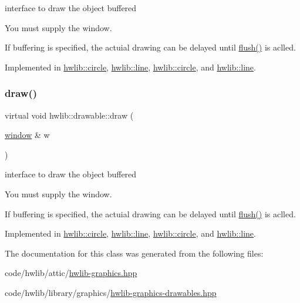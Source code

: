 interface to draw the object buffered 

You must supply the window.

If buffering is specified, the actuial drawing can be delayed until \hyperlink{namespacehwlib_a648fe94ca9899747a632c23f97007732}{flush()} is aclled. 

Implemented in \hyperlink{classhwlib_1_1circle_a7a4d6bbd0692b757eee4615a8c5ea9f4}{hwlib\+::circle}, \hyperlink{classhwlib_1_1line_a0a30c7c7e88377aada5ee1ec422bfc84}{hwlib\+::line}, \hyperlink{classhwlib_1_1circle_a7a4d6bbd0692b757eee4615a8c5ea9f4}{hwlib\+::circle}, and \hyperlink{classhwlib_1_1line_a0a30c7c7e88377aada5ee1ec422bfc84}{hwlib\+::line}.

\mbox{\label{classhwlib_1_1drawable_ac9ea0de52a14d9024cb34110f794ac28}} 
\subsubsection{\texorpdfstring{draw()}{draw()}\hspace{0.1cm}{\footnotesize\ttfamily [2/2]}}
{\footnotesize\ttfamily virtual void hwlib\+::drawable\+::draw (\begin{DoxyParamCaption}\item[{\hyperlink{classhwlib_1_1window}{window} \&}]{w }\end{DoxyParamCaption})\hspace{0.3cm}{\ttfamily [pure virtual]}}



interface to draw the object buffered 

You must supply the window.

If buffering is specified, the actuial drawing can be delayed until \hyperlink{namespacehwlib_a648fe94ca9899747a632c23f97007732}{flush()} is aclled. 

Implemented in \hyperlink{classhwlib_1_1circle_a7a4d6bbd0692b757eee4615a8c5ea9f4}{hwlib\+::circle}, \hyperlink{classhwlib_1_1line_a0a30c7c7e88377aada5ee1ec422bfc84}{hwlib\+::line}, \hyperlink{classhwlib_1_1circle_a7a4d6bbd0692b757eee4615a8c5ea9f4}{hwlib\+::circle}, and \hyperlink{classhwlib_1_1line_a0a30c7c7e88377aada5ee1ec422bfc84}{hwlib\+::line}.



The documentation for this class was generated from the following files\+:\begin{DoxyCompactItemize}
\item 
code/hwlib/attic/\hyperlink{hwlib-graphics_8hpp}{hwlib-\/graphics.\+hpp}\item 
code/hwlib/library/graphics/\hyperlink{hwlib-graphics-drawables_8hpp}{hwlib-\/graphics-\/drawables.\+hpp}\end{DoxyCompactItemize}

